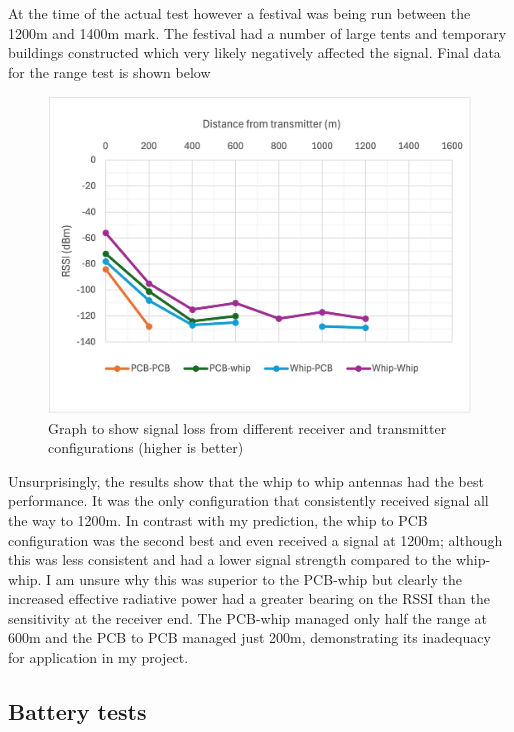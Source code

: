 At the time of the actual test however a festival was being run between the
1200m and 1400m mark. The festival had a number of large tents and temporary
buildings constructed which very likely negatively affected the signal. Final
data for the range test is shown below

\begin{figure}[H]
    \centering
    \includegraphics[width=1\textwidth]{contents/part-2/fig2/distance-graph.jpg}
    \caption{Graph to show signal loss from different receiver and transmitter configurations (higher is better)}
    \label{fig:range-test-graph}
\end{figure}

Unsurprisingly, the results show that the whip to whip antennas had the best
performance. It was the only configuration that consistently received signal all
the way to 1200m. In contrast with my prediction, the whip to PCB configuration
was the second best and even received a signal at 1200m; although this was less
consistent and had a lower signal strength compared to the whip-whip. I am
unsure why this was superior to the PCB-whip but clearly the increased effective
radiative power had a greater bearing on the RSSI than the sensitivity at the
receiver end. The PCB-whip managed only half the range at 600m and the PCB to
PCB managed just 200m, demonstrating its inadequacy for application in my
project.

\subsection{Battery tests}\label{sec:battery-tests}

